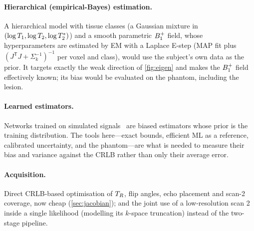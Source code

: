 \paragraph{Hierarchical (empirical-Bayes) estimation.} A hierarchical model with tissue classes
(a Gaussian mixture in $(\log T_1,\log T_2,\log T_2^{*})$) and a smooth parametric $B_1^{+}$ field, whose
hyperparameters are estimated by EM with a Laplace E-step (MAP fit plus
$(J^{\mathsf T}J+\Sigma_k^{-1})^{-1}$ per voxel and class), would use the subject's own data as the
prior. It targets exactly the weak direction of \cref{fig:eigen} and makes the $B_1^{+}$ field
effectively known; its bias would be evaluated on the phantom, including the lesion.

\paragraph{Learned estimators.} Networks trained on simulated signals~\cite{cheng2020} are
biased estimators whose prior is the training distribution. The tools here---exact bounds,
efficient ML as a reference, calibrated uncertainty, and the phantom---are what is needed to
measure their bias and variance against the CRLB rather than only their average error.

\paragraph{Acquisition.} Direct CRLB-based optimisation of $T_R$, flip angles, echo placement
and scan-2 coverage, now cheap (\cref{sec:jacobian}); and the joint use of a low-resolution
scan 2 inside a single likelihood (modelling its $k$-space truncation) instead of the two-stage
pipeline.
